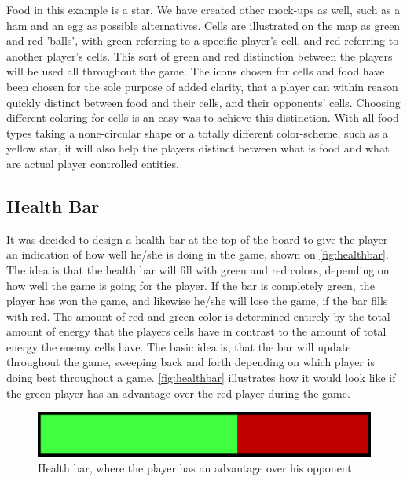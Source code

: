Food in this example is a star.
We have created other mock-ups as well, such as a ham and an egg as possible alternatives. 
Cells are illustrated on the map as green and red 'balls', with green referring to a specific player's cell, and red referring to another player's cells.
This sort of green and red distinction between the players will be used all throughout the game.
The icons chosen for cells and food have been chosen for the sole purpose of added clarity, that a player can within reason quickly distinct between food and their cells, and their opponents' cells.
Choosing different coloring for cells is an easy was to achieve this distinction.
With all food types taking a none-circular shape or a totally different color-scheme, such as a yellow star, it will also help the players distinct between what is food and what are actual player controlled entities.

\subsection{Health Bar}
It was decided to design a health bar at the top of the board to give the player an indication of how well he/she is doing in the game, shown on \autoref{fig:healthbar}.
The idea is that the health bar will fill with green and red colors, depending on how well the game is going for the player.
If the bar is completely green, the player has won the game, and likewise he/she will lose the game, if the bar fills with red.
The amount of red and green color is determined entirely by the total amount of energy that the players cells have in contrast to the amount of total energy the enemy cells have.
The basic idea is, that the bar will update throughout the game, sweeping back and forth depending on which player is doing best throughout a game.
\autoref{fig:healthbar} illustrates how it would look like if the green player has an advantage over the red player during the game.

\begin{figure}[ht]
	\centering
		\includegraphics{img/healthbar_example.png}
	\caption{Health bar, where the player has an advantage over his opponent}
	\label{fig:healthbar}
\end{figure}

